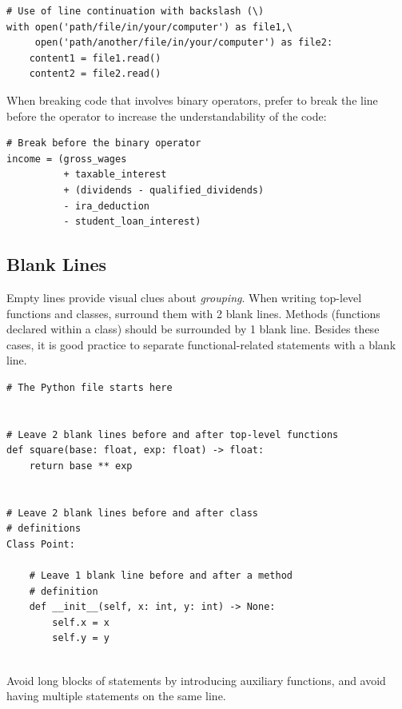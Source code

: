 \documentclass{tufte-handout}
\begin{document}
\begin{mdframed}
\begin{verbatim}
# Use of line continuation with backslash (\)
with open('path/file/in/your/computer') as file1,\
     open('path/another/file/in/your/computer') as file2:
    content1 = file1.read()
    content2 = file2.read()
\end{verbatim}
\end{mdframed}

When breaking code that involves binary operators, prefer to break the line before the operator to increase the understandability of the code:

\begin{mdframed}
\begin{verbatim}
# Break before the binary operator
income = (gross_wages
          + taxable_interest
          + (dividends - qualified_dividends)
          - ira_deduction
          - student_loan_interest)
\end{verbatim}
\end{mdframed}

\subsection{Blank Lines}

Empty lines provide visual clues about \emph{grouping}.
When writing top-level functions and classes, surround them with 2 blank lines.
Methods (functions declared within a class) should be surrounded by 1 blank line.	
Besides these cases, it is good practice to separate functional-related statements with a blank line.

\begin{mdframed}
\begin{verbatim}
# The Python file starts here


# Leave 2 blank lines before and after top-level functions
def square(base: float, exp: float) -> float:
    return base ** exp


# Leave 2 blank lines before and after class 
# definitions
Class Point:
	
	# Leave 1 blank line before and after a method 
	# definition	
	def __init__(self, x: int, y: int) -> None:
	    self.x = x
	    self.y = y
     
\end{verbatim}
\end{mdframed}

Avoid long blocks of statements by introducing auxiliary functions, and avoid having multiple statements on the same line.
\end{document}
